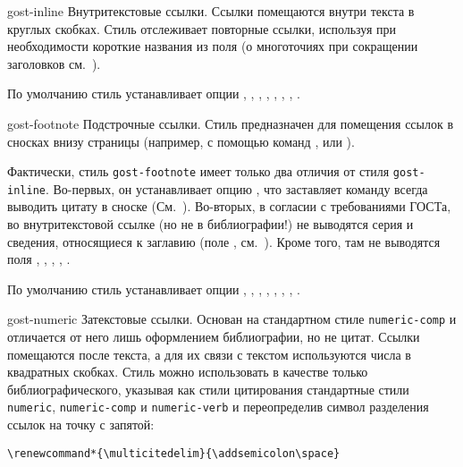 \documentclass[10pt,a4paper,headings=small,numbers=enddot,english,russian]{ltxdockit}
\newcommand*{\bibsty}{\texttt}
\renewcommand*{\tabref}{\refs{табл.}{табл.}}
\begin{document}
\begin{marglist}

\item[gost-inline]
Внутритекстовые ссылки. Ссылки помещаются внутри текста в круглых скобках.
Стиль отслеживает
повторные ссылки, используя при необходимости короткие названия из поля
 (о многоточиях при сокращении заголовков
см.~).

По умолчанию стиль устанавливает опции , ,
 , , ,
, ,
.

\item[gost-footnote]
Подстрочные ссылки.
Стиль предназначен для помещения ссылок в сносках внизу страницы (например, с помощью
команд ,  или ).

Фактически, стиль \bibsty{gost-footnote} имеет только два отличия от стиля
\bibsty{gost-inline}.
Во-первых, он устанавливает опцию , что заставляет команду
 всегда выводить цитату в сноске
(См.~). Во-вторых, в согласии с требованиями ГОСТа,
во внутритекстовой ссылке (но не
в библиографии!) не выводятся серия и сведения, относящиеся
к заглавию (поле , см.~\tabref{tab:gost-biblatex}). Кроме того,
там не выводятся поля ,
, , , .

По умолчанию стиль устанавливает опции , ,
, , ,
, ,
.

\item[gost-numeric]
Затекстовые ссылки. Основан на стандартном стиле \bibsty{numeric-comp} и отличается
от него лишь оформлением библиографии, но не цитат. Ссылки помещаются после текста,
а для их связи с текстом используются числа в квадратных скобках. Стиль можно использовать
в качестве только
библиографического, указывая как стили цитирования стандартные стили \bibsty{numeric},
\bibsty{numeric-comp} и \bibsty{numeric-verb} и переопределив символ разделения ссылок на
точку с запятой:

\begin{lstlisting}[style=latex]
\renewcommand*{\multicitedelim}{\addsemicolon\space}
\end{lstlisting}


\end{marglist}
\end{document}
